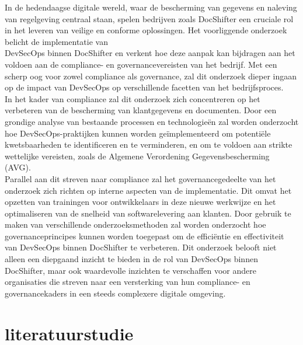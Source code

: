 \documentclass{hogent-article}
\begin{document}
    In de hedendaagse digitale wereld, waar de bescherming van gegevens en naleving van regelgeving centraal staan, spelen bedrijven zoals DocShifter een cruciale rol in het leveren van veilige en conforme oplossingen. Het voorliggende onderzoek belicht de implementatie van \\ DevSecOps binnen DocShifter en verkent hoe deze aanpak kan bijdragen aan het voldoen aan de compliance- en governancevereisten van het bedrijf. Met een scherp oog voor zowel compliance als governance, zal dit onderzoek dieper ingaan op de impact van DevSecOps op verschillende facetten van het bedrijfsproces.\\
    In het kader van compliance zal dit onderzoek zich concentreren op het verbeteren van de bescherming van klantgegevens en documenten. Door een grondige analyse van bestaande processen en technologieën zal worden onderzocht hoe DevSecOps-praktijken kunnen worden geïmplementeerd om potentiële kwetsbaarheden te identificeren en te verminderen, en om te voldoen aan strikte wettelijke vereisten, zoals de Algemene Verordening Gegevensbescherming \\(AVG).\\
    Parallel aan dit streven naar compliance zal het governancegedeelte van het onderzoek zich richten op interne aspecten van de implementatie. Dit omvat het opzetten van trainingen voor ontwikkelaars in deze nieuwe werkwijze en het optimaliseren van de snelheid van softwarelevering aan klanten. Door gebruik te maken van verschillende onderzoeksmethoden zal worden onderzocht hoe governanceprincipes kunnen worden toegepast om de efficiëntie en effectiviteit van DevSecOps binnen DocShifter te verbeteren.
    Dit onderzoek belooft niet alleen een diepgaand inzicht te bieden in de rol van DevSecOps binnen DocShifter, maar ook waardevolle inzichten te verschaffen voor andere organisaties die streven naar een versterking van hun compliance- en governancekaders in een steeds complexere digitale omgeving.
    
    
    
    \section{literatuurstudie}%
    \label{sec:literatuurstudie}
\end{document}
